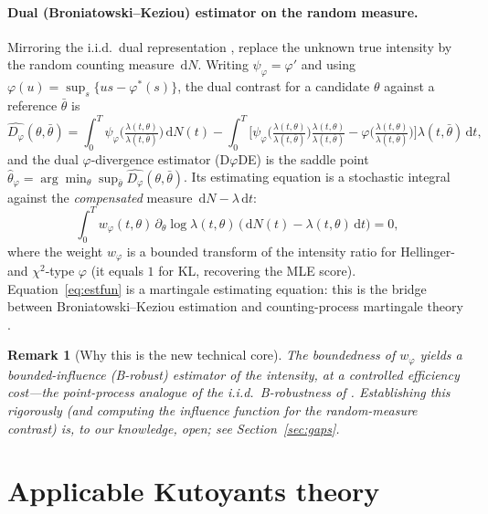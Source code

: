 \documentclass[11pt]{article}
\newtheorem{remark}{Remark}
\newcommand{\dd}{\,\mathrm{d}}
\newcommand{\Dphi}{D_\varphi}
\begin{document}
\paragraph{Dual (Broniatowski--Keziou) estimator on the random measure.}
Mirroring the i.i.d.\ dual representation \citep{bk2006,bk2009}, replace the
unknown true intensity by the random counting measure $\dd N$. Writing
$\psi_\varphi=\varphi'$ and using
$\varphi(u)=\sup_{s}\{us-\varphi^\ast(s)\}$, the dual contrast for a candidate
$\theta$ against a reference $\bar\theta$ is
\begin{equation}\label{eq:dual}
\widehat{\Dphi}(\theta,\bar\theta)
=\int_0^T \psi_\varphi\!\Big(\tfrac{\lambda(t,\theta)}{\lambda(t,\bar\theta)}\Big)\dd N(t)
-\int_0^T\Big[\psi_\varphi\big(\tfrac{\lambda(t,\theta)}{\lambda(t,\bar\theta)}\big)
\tfrac{\lambda(t,\theta)}{\lambda(t,\bar\theta)}
-\varphi\big(\tfrac{\lambda(t,\theta)}{\lambda(t,\bar\theta)}\big)\Big]\lambda(t,\bar\theta)\dd t,
\end{equation}
and the dual $\varphi$-divergence estimator (D$\varphi$DE) is the saddle point
$\hat\theta_\varphi=\arg\min_\theta\sup_{\bar\theta}\widehat{\Dphi}(\theta,\bar\theta)$.
Its estimating equation is a stochastic integral against the \emph{compensated}
measure $\dd N-\lambda\dd t$:
\begin{equation}\label{eq:estfun}
\int_0^T w_\varphi(t,\theta)\,\partial_\theta\log\lambda(t,\theta)\,
\big(\dd N(t)-\lambda(t,\theta)\dd t\big)=0,
\end{equation}
where the weight $w_\varphi$ is a bounded transform of the intensity ratio for
Hellinger- and $\chi^2$-type $\varphi$ (it equals $1$ for KL, recovering the MLE
score). Equation~\eqref{eq:estfun} is a martingale estimating equation: this is
the bridge between Broniatowski--Keziou estimation and counting-process
martingale theory \citep{abgk1993,rebolledo1980}.

\begin{remark}[Why this is the new technical core]
The boundedness of $w_\varphi$ yields a \emph{bounded-influence} (B-robust)
estimator of the intensity, at a controlled efficiency cost---the point-process
analogue of the i.i.d.\ B-robustness of \citet{bk2009}. Establishing this
rigorously (and computing the influence function for the random-measure contrast)
is, to our knowledge, open; see Section~\ref{sec:gaps}.
\end{remark}

\section{Applicable Kutoyants theory}\label{sec:kuto}
\end{document}
